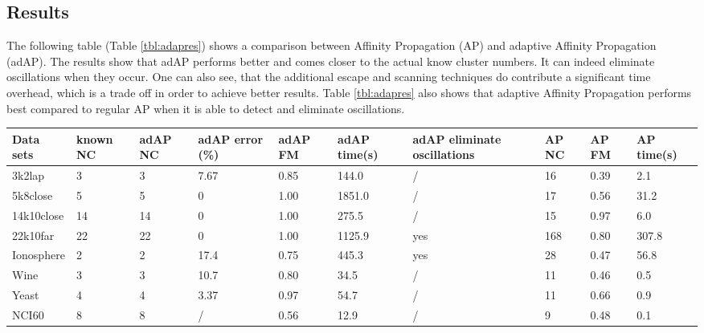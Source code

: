 \documentclass[11pt,a4paper]{article}
\begin{document}
\subsection{Results}
The following table (Table \ref{tbl:adapres}) shows a comparison between Affinity Propagation (AP) and adaptive Affinity Propagation (adAP). The results show that adAP performs better and comes closer to the actual know cluster numbers. It can indeed eliminate oscillations when they occur. One can also see, that the additional escape and scanning techniques do contribute a significant time overhead, which is a trade off in order to achieve better results. Table \ref{tbl:adapres} also shows that adaptive Affinity Propagation performs best compared to regular AP when it is able to detect and eliminate oscillations.
\begin{table}[h]
	\begin{center}
		\begin{tabularx}{\textwidth}{@{}XYYYYYYYYY@{}}
			\hline
			Data sets   & known NC & adAP NC & adAP error (\%) & adAP FM & adAP time(s) & adAP eliminate oscillations & AP NC & AP FM  & AP time(s) \\\hline
			3k2lap      & 3        & 3       & 7.67            & 0.85    & 144.0        & /                           & 16    & 0.39   & 2.1        \\
			5k8close    & 5        & 5       & 0               & 1.00    & 1851.0       & /                           & 17    & 0.56   & 31.2       \\
			14k10close  & 14       & 14      & 0               & 1.00    & 275.5        & /                           & 15    & 0.97   & 6.0        \\
			22k10far    & 22       & 22      & 0               & 1.00    & 1125.9       & yes                         & 168   & 0.80   & 307.8      \\
			Ionosphere  & 2        & 2       & 17.4            & 0.75    & 445.3        & yes                         & 28    & 0.47   & 56.8       \\
			Wine        & 3        & 3       & 10.7            & 0.80    & 34.5         & /                           & 11    & 0.46   & 0.5        \\
			Yeast       & 4        & 4       & 3.37            & 0.97    & 54.7         & /                           & 11    & 0.66   & 0.9        \\
			NCI60       & 8        & 8       & /               & 0.56    & 12.9         & /                           & 9     & 0.48   & 0.1        \\

\end{tabularx}
\end{center}
\end{table}
\end{document}
